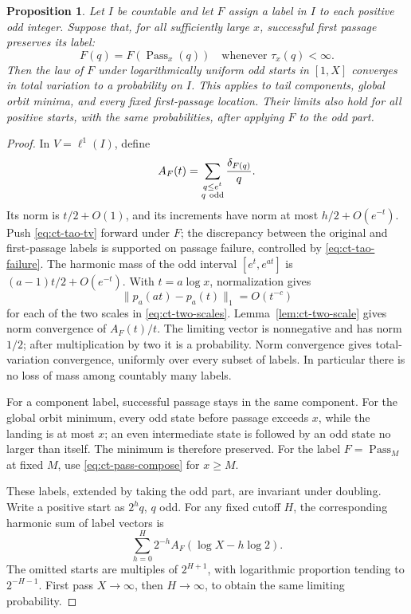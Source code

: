 \documentclass[11pt,a4paper]{article}
\newtheorem{proposition}[theorem]{Proposition}
\begin{document}
\begin{proposition}\label{prop:ct-label-laws}
Let \(I\) be countable and let \(F\) assign a label in \(I\) to
each positive odd integer. Suppose that, for all sufficiently large
\(x\), successful first passage preserves its label:
\[
 F(q)=F(\operatorname{Pass}_x(q))
 \quad\text{whenever }\tau_x(q)<\infty.
\]
Then the law of \(F\) under logarithmically uniform odd starts in
\([1,X]\) converges in total variation to a probability on \(I\).
This applies to tail components, global orbit minima, and every
fixed first-passage location. Their limits also hold for all positive
starts, with the same probabilities, after applying \(F\) to the odd
part.
\end{proposition}
\begin{proof}
In \(V=\ell^1(I)\), define
\[
 A_F(t)=\sum_{\substack{q\le e^t\\q\ {\rm odd}}}
                       \frac{\delta_{F(q)}}q.
\]
Its norm is \(t/2+O(1)\), and its increments have norm
at most \(h/2+O(e^{-t})\). Push
\eqref{eq:ct-tao-tv} forward under \(F\); the discrepancy between
the original and first-passage labels is supported on passage
failure, controlled by \eqref{eq:ct-tao-failure}.
The harmonic mass of the odd interval \([e^t,e^{at}]\) is
\((a-1)t/2+O(e^{-t})\). With \(t=a\log x\), normalization gives
\[
 \|p_a(at)-p_a(t)\|_1=O(t^{-c})
\]
for each of the two scales in \eqref{eq:ct-two-scales}.
Lemma~\ref{lem:ct-two-scale} gives norm convergence of \(A_F(t)/t\).
The limiting vector is nonnegative and has norm \(1/2\); after
multiplication by two it is a probability. Norm convergence gives
total-variation convergence, uniformly over every subset of labels.
In particular there is no loss of mass among countably many labels.

For a component label, successful passage stays in the same
component. For the global orbit minimum, every odd state before
passage exceeds \(x\), while the landing is at most \(x\);
an even intermediate state is followed by an odd state no larger
than itself. The minimum is therefore preserved. For the label
\(F=\operatorname{Pass}_M\) at fixed \(M\), use
\eqref{eq:ct-pass-compose} for \(x\ge M\).

These labels, extended by taking the odd part, are invariant under
doubling. Write a positive start as \(2^hq\), \(q\) odd.
For any fixed cutoff \(H\), the corresponding harmonic sum of
label vectors is
\[
 \sum_{h=0}^H2^{-h}A_F(\log X-h\log2).
\]
The omitted starts are multiples of \(2^{H+1}\), with logarithmic
proportion tending to \(2^{-H-1}\). First pass \(X\to\infty\),
then \(H\to\infty\), to obtain the same limiting probability.
\end{proof}
\end{document}
